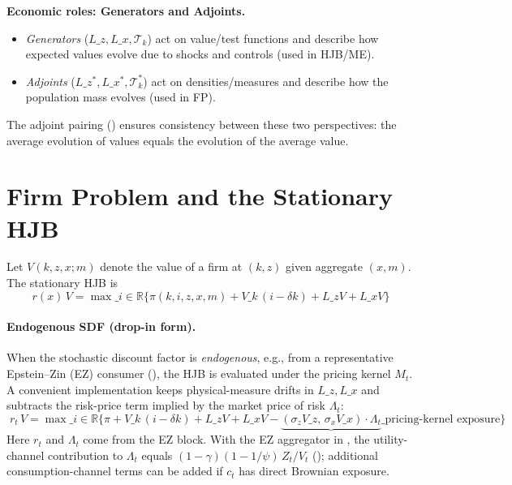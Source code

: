 \documentclass[11pt,letterpaper,oneside]{article}
\numberwithin{equation}{section}
\newcommand{\ac}[1]{{\mdseries\textsc{#1}}}
\newcommand{\R}{\mathbb{R}}
\newcommand{\1}{\mathbf{1}}
\newcommand{\Lz}{L\_z}
\newcommand{\Lx}{L\_x}
\newcommand{\Lzadj}{L\_z^{\!*}}
\begin{document}
\begin{tcolorbox}[didacticstyle]
\textbf{Economic roles: Generators and Adjoints.}
\begin{itemize}[leftmargin=1.15em,itemsep=0.25em]
 \item \emph{Generators} ($\Lz, \Lx, \mathcal T_k$) act on value/test functions and describe how expected values evolve due to shocks and controls (used in HJB/ME).
 \item \emph{Adjoints} ($\Lzadj, \Lx^{\!*}, \mathcal T_k^{\!*}$) act on densities/measures and describe how the population mass evolves (used in FP).
\end{itemize}
The adjoint pairing () ensures consistency between these two perspectives: the average evolution of values equals the evolution of the average value.
\end{tcolorbox}

\section{Firm Problem and the Stationary HJB}

Let $V(k,z,x;m)$ denote the value of a firm at $(k,z)$ given aggregate $(x,m)$. The stationary \ac{HJB} is
\begin{equation}
\boxed{\; r(x)\,V 
  = \max\_{i\in\R} \Big\{ \pi(k,i,z,x,m) + V\_k\,(i-\delta k) + \Lz V + \Lx V \Big\} \;}
\tag{HJB}\label{eq:HJB}
\end{equation}

\paragraph{Endogenous SDF (drop-in form).}
When the stochastic discount factor is \emph{endogenous}, e.g., from a representative Epstein--Zin (EZ) consumer (), the HJB is evaluated under the pricing kernel $M_t$. A convenient implementation keeps physical-measure drifts in $\Lz,\Lx$ and subtracts the risk-price term implied by the market price of risk $\Lambda_t$:
\begin{equation}\label{eq:HJB-EZ}
\boxed{\; r_t\,V 
  = \max\_{i\in\R} \Big\{ \pi + V\_k\,(i-\delta k) + \Lz V + \Lx V 
      - \underbrace{(\sigma_z V\_z,\, \sigma_x V\_x)\cdot\Lambda_t}\_{\text{pricing-kernel exposure}} \Big\} \;}
\end{equation}
Here $r_t$ and $\Lambda_t$ come from the EZ block. With the EZ aggregator in , the utility-channel contribution to $\Lambda_t$ equals $(1-\gamma)(1-1/\psi)\,Z_t/V_t$ (); additional consumption-channel terms can be added if $c_t$ has direct Brownian exposure.
\end{document}

